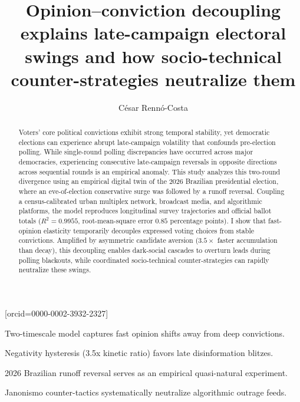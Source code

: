 \documentclass[a4paper,fleqn]{cas-dc}
\begin{document}
\let\WriteBookmarks\relax
\renewcommand{\topfraction}{0.95}
\renewcommand{\bottomfraction}{0.95}
\renewcommand{\textfraction}{0.05}
\renewcommand{\floatpagefraction}{0.40}
\renewcommand{\dbltopfraction}{0.95}
\renewcommand{\dblfloatpagefraction}{0.40}
\setcounter{topnumber}{4}
\setcounter{bottomnumber}{4}
\setcounter{totalnumber}{8}
\setcounter{dbltopnumber}{4}


\title [mode = title]{Opinion--conviction decoupling explains late-campaign electoral swings and how socio-technical counter-strategies neutralize them}

\author[1]{César Rennó-Costa}[orcid=0000-0002-3932-2327]
\cormark[1]



\begin{highlights}
\item Two-timescale model captures fast opinion shifts away from deep convictions.
\item Negativity hysteresis (3.5x kinetic ratio) favors late disinformation blitzes.
\item 2026 Brazilian runoff reversal serves as an empirical quasi-natural experiment.
\item Janonismo counter-tactics systematically neutralize algorithmic outrage feeds.
\end{highlights}

\begin{abstract}
Voters' core political convictions exhibit strong temporal stability, yet democratic elections can experience abrupt late-campaign volatility that confounds pre-election polling. While single-round polling discrepancies have occurred across major democracies, experiencing consecutive late-campaign reversals in opposite directions across sequential rounds is an empirical anomaly. This study analyzes this two-round divergence using an empirical digital twin of the 2026 Brazilian presidential election, where an eve-of-election conservative surge was followed by a runoff reversal. Coupling a census-calibrated urban multiplex network, broadcast media, and algorithmic platforms, the model reproduces longitudinal survey trajectories and official ballot totals ($R^2 = 0.9955$, root-mean-square error $0.85$ percentage points). I show that fast-opinion elasticity temporarily decouples expressed voting choices from stable convictions. Amplified by asymmetric candidate aversion ($3.5\times$ faster accumulation than decay), this decoupling enables dark-social cascades to overturn leads during polling blackouts, while coordinated socio-technical counter-strategies can rapidly neutralize these swings.
\end{abstract}
\end{document}
